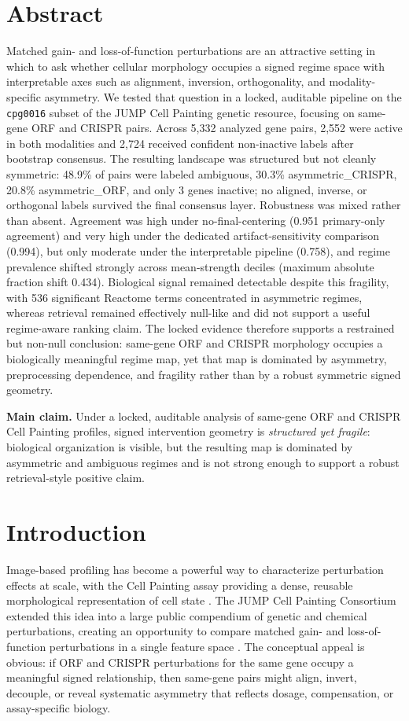 \documentclass[11pt]{article}
\newcommand{\panelbox}[1]{%
  \begingroup
  \setlength{\fboxsep}{10pt}%
  \noindent\colorbox{panel}{%
    \parbox{\dimexpr\textwidth-2\fboxsep\relax}{#1}%
  }%
  \endgroup
}
\begin{document}
\section*{Abstract}
Matched gain- and loss-of-function perturbations are an attractive setting in which to ask whether cellular morphology occupies a signed regime space with interpretable axes such as alignment, inversion, orthogonality, and modality-specific asymmetry. We tested that question in a locked, auditable pipeline on the \texttt{cpg0016} subset of the JUMP Cell Painting genetic resource, focusing on same-gene ORF and CRISPR pairs. Across 5,332 analyzed gene pairs, 2,552 were active in both modalities and 2,724 received confident non-inactive labels after bootstrap consensus. The resulting landscape was structured but not cleanly symmetric: 48.9\% of pairs were labeled ambiguous, 30.3\% asymmetric\_CRISPR, 20.8\% asymmetric\_ORF, and only 3 genes inactive; no aligned, inverse, or orthogonal labels survived the final consensus layer. Robustness was mixed rather than absent. Agreement was high under no-final-centering (0.951 primary-only agreement) and very high under the dedicated artifact-sensitivity comparison (0.994), but only moderate under the interpretable pipeline (0.758), and regime prevalence shifted strongly across mean-strength deciles (maximum absolute fraction shift 0.434). Biological signal remained detectable despite this fragility, with 536 significant Reactome terms concentrated in asymmetric regimes, whereas retrieval remained effectively null-like and did not support a useful regime-aware ranking claim. The locked evidence therefore supports a restrained but non-null conclusion: same-gene ORF and CRISPR morphology occupies a biologically meaningful regime map, yet that map is dominated by asymmetry, preprocessing dependence, and fragility rather than by a robust symmetric signed geometry.

\panelbox{\textbf{Main claim.} Under a locked, auditable analysis of same-gene ORF and CRISPR Cell Painting profiles, signed intervention geometry is \emph{structured yet fragile}: biological organization is visible, but the resulting map is dominated by asymmetric and ambiguous regimes and is not strong enough to support a robust retrieval-style positive claim.}

\section{Introduction}
Image-based profiling has become a powerful way to characterize perturbation effects at scale, with the Cell Painting assay providing a dense, reusable morphological representation of cell state \cite{bray2016cellpainting, cimini2023optimizing}. The JUMP Cell Painting Consortium extended this idea into a large public compendium of genetic and chemical perturbations, creating an opportunity to compare matched gain- and loss-of-function perturbations in a single feature space \cite{jump2025genetic}. The conceptual appeal is obvious: if ORF and CRISPR perturbations for the same gene occupy a meaningful signed relationship, then same-gene pairs might align, invert, decouple, or reveal systematic asymmetry that reflects dosage, compensation, or assay-specific biology.
\end{document}
